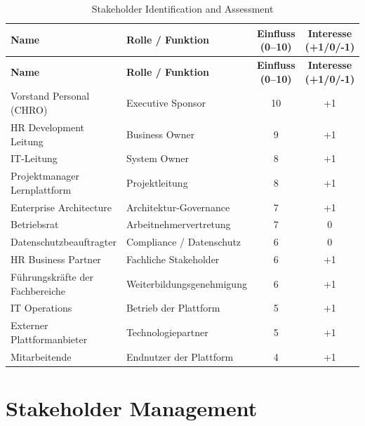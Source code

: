 \begin{xltabular}{\textwidth}{@{}XXcc@{}}
	\caption{Stakeholder Identification and Assessment} \label{tab:stakeholder-id} \\
	\hline
	\textbf{Name} & \textbf{Rolle / Funktion} & \textbf{Einfluss (0--10)} & \textbf{Interesse (+1/0/-1)} \\
	\hline
	\endfirsthead

	\hline
	\textbf{Name} & \textbf{Rolle / Funktion} & \textbf{Einfluss (0--10)} & \textbf{Interesse (+1/0/-1)} \\
	\hline
	\endhead

	\hline
	\endfoot

	Vorstand Personal (\ac{CHRO}) & Executive Sponsor & 10 & +1 \\

	\ac{HR} Development Leitung & Business Owner & 9 & +1 \\

	\ac{IT}-Leitung & System Owner & 8 & +1 \\

	Projektmanager Lernplattform & Projektleitung & 8 & +1 \\

	Enterprise Architecture & Architektur-Governance & 7 & +1 \\

	Betriebsrat & Arbeitnehmervertretung & 7 & 0 \\

	Datenschutz\-beauftragter & Compliance / Datenschutz & 6 & 0 \\

	\ac{HR} Business Partner & Fachliche Stakeholder & 6 & +1 \\

	Führungskräfte der Fachbereiche & Weiterbildungsgenehmigung & 6 & +1 \\

	\ac{IT} Operations & Betrieb der Plattform & 5 & +1 \\

	Externer Plattformanbieter & Technologiepartner & 5 & +1 \\

	Mitarbeitende & Endnutzer der Plattform & 4 & +1 \\

\end{xltabular}


\section{Stakeholder Management}

